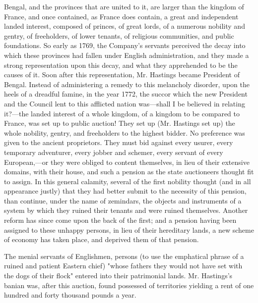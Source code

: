 Bengal, and the provinces that are united to it, are larger than the kingdom of France, and once contained, as France does contain, a great and independent landed interest, composed of princes, of great lords, of a numerous nobility and gentry, of freeholders, of lower tenants, of religious communities, and public foundations. So early as 1769, the Company's servants perceived the decay into which these provinces had fallen under English administration, and they made a strong representation upon this decay, and what they apprehended to be the causes of it. Soon after this representation, Mr. Hastings became President of Bengal. Instead of administering a remedy to this melancholy disorder, upon the heels of a dreadful famine, in the year 1772, the succor which the new President and the Council lent to this afflicted nation was—shall I be believed in relating it?—the landed interest of a whole kingdom, of a kingdom to be compared to France, was set up to public auction! They set up (Mr. Hastings set up) the whole nobility, gentry, and freeholders to the highest bidder. No preference was given to the ancient proprietors. They must bid against every usurer, every temporary adventurer, every jobber and schemer, every servant of every European,—or they were obliged to content themselves, in lieu of their extensive domains, with their house, and such a pension as the state auctioneers thought fit to assign. In this general calamity, several of the first nobility thought (and in all appearance justly) that they had better submit to the necessity of this pension, than continue, under the name of zemindars, the objects and instruments of a system by which they ruined their tenants and were ruined themselves. Another reform has since come upon the back of the first; and a pension having been assigned to these unhappy persons, in lieu of their hereditary lands, a new scheme of economy has taken place, and deprived them of that pension.

The menial servants of Englishmen, persons (to use the emphatical phrase of a ruined and patient Eastern chief) "whose fathers they would not have set with the dogs of their flock" entered into their patrimonial lands. Mr. Hastings's banian was, after this auction, found possessed of territories yielding a rent of one hundred and forty thousand pounds a year.

